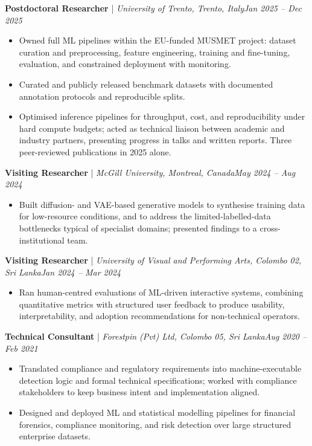 \documentclass[11pt]{article}
\newenvironment{cvrole}[5]{%
  \par\noindent\textbf{#1} | \textit{\small #2, #3}\hfill \textit{\small #4 -- #5}\par
  \begin{itemize}[leftmargin=1.4em, itemsep=-0.3em, topsep=-0.15em]%
}{%
  \end{itemize}\par\noindent\mbox{}\par\vspace{-0.55em}%
}
\begin{document}
\begin{cvrole}{Postdoctoral Researcher}{University of Trento}{Trento, Italy}{Jan 2025}{Dec 2025}
    \item Owned full ML pipelines within the EU-funded MUSMET project: dataset curation and preprocessing, feature engineering, training and fine-tuning, evaluation, and constrained deployment with monitoring.
    \item Curated and publicly released benchmark datasets with documented annotation protocols and reproducible splits.
    \item Optimised inference pipelines for throughput, cost, and reproducibility under hard compute budgets; acted as technical liaison between academic and industry partners, presenting progress in talks and written reports. Three peer-reviewed publications in 2025 alone.
\end{cvrole}

\begin{cvrole}{Visiting Researcher}{McGill University}{Montreal, Canada}{May 2024}{Aug 2024}
    \item Built diffusion- and VAE-based generative models to synthesise training data for low-resource conditions, and to address the limited-labelled-data bottlenecks typical of specialist domains; presented findings to a cross-institutional team.
\end{cvrole}

\begin{cvrole}{Visiting Researcher}{University of Visual and Performing Arts}{Colombo 02, Sri Lanka}{Jan 2024}{Mar 2024}
    \item Ran human-centred evaluations of ML-driven interactive systems, combining quantitative metrics with structured user feedback to produce usability, interpretability, and adoption recommendations for non-technical operators.
\end{cvrole}

\begin{cvrole}{Technical Consultant}{Forestpin (Pvt) Ltd}{Colombo 05, Sri Lanka}{Aug 2020}{Feb 2021}
    \item Translated compliance and regulatory requirements into machine-executable detection logic and formal technical specifications; worked with compliance stakeholders to keep business intent and implementation aligned.
    \item Designed and deployed ML and statistical modelling pipelines for financial forensics, compliance monitoring, and risk detection over large structured enterprise datasets.
\end{cvrole}
\end{document}
